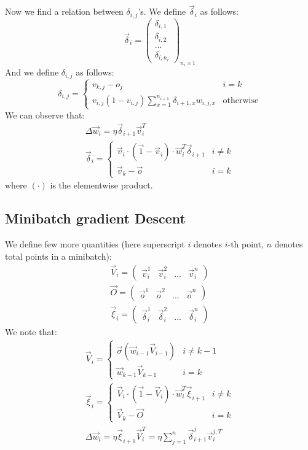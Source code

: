 \documentclass{article}
\begin{document}
Now we find a relation between $\delta_{i,j}$'s. We define $\vec \delta_i$ as follows:
$$\vec \delta_i=\begin{pmatrix}\delta_{i,1}\\\delta_{i,2}\\...\\\delta_{i,n_i}\end{pmatrix}_{n_i\times 1}$$
And we define $\delta_{i,j}$ as follows:
$$\delta_{i,j}=\begin{cases}v_{k,j}-o_j&i=k\\\displaystyle v_{i,j}(1-v_{i,j})\sum_{x=1}^{n_{i+1}}\delta_{i+1,x}w_{i,j,x}&\text{otherwise}\end{cases}$$
We can observe that:
\begin{gather*}\Delta\vec w_{i}=\eta \vec \delta_{i+1}\vec v_{i}^T\\
\vec\delta_i=\begin{cases}\vec v_i \cdot (\vec 1-\vec v_i)\cdot \vec w_i^T\vec \delta_{i+1}&i\ne k\\\vec v_k-\vec o&i=k\end{cases}
\end{gather*}
where $(\cdot)$ is the elementwise product.
\subsection{Minibatch gradient Descent}
We define few more quantities (here superscript $i$ denotes $i$-th point, $n$ denotes total points in a minibatch):
\begin{gather*}
\vec V_i = \begin{pmatrix}\vec v_i^1&\vec v_i^2&...&\vec v_i^n\end{pmatrix}\\
\vec O = \begin{pmatrix}\vec o^1&\vec o^2&...&\vec o^n\end{pmatrix}\\
\vec \xi_i =\begin{pmatrix}\vec \delta_i^1&\vec \delta_i^2&...&\vec \delta_i^n\end{pmatrix}
\end{gather*}
We note that:
\begin{gather*}
\vec V_i = \begin{cases}\vec \sigma (\vec w_{i-1}\vec V_{i-1})&i\ne k-1\\ \vec w_{k-1}\vec V_{k-1}&i=k\end{cases}\\
\vec \xi_i = \begin{cases}\vec V_i\cdot (\vec 1-\vec V_i)\cdot\vec w_i^T\vec \xi_{i+1}&i\ne k\\\vec V_k-\vec O&i=k\end{cases}\\
\Delta \vec w_i = \eta\vec \xi_{i+1} \vec V_{i}^T=\eta \sum_{j=1}^n\vec \delta_{i+1}^j\vec v_i^{j,T}
\end{gather*}
\end{document}
